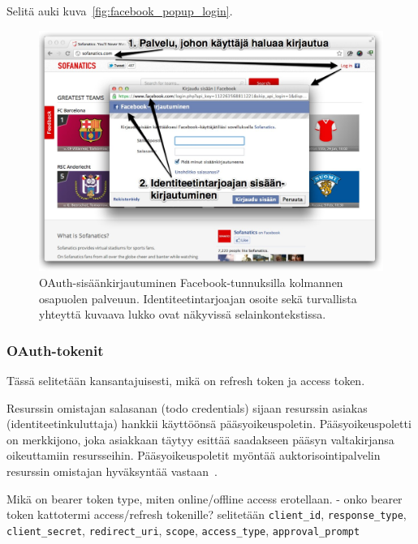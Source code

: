 \documentclass[finnish,gradu]{tktltiki}
\begin{document}
  Selitä auki kuva~\ref{fig:facebook_popup_login}.

  \begin{figure}
    \centering
    \includegraphics[width=1.0\textwidth]{images/facebook_popup_login.jpg}
    \caption{OAuth-sisäänkirjautuminen Facebook-tunnuksilla kolmannen osapuolen palveuun. Identiteetintarjoajan osoite sekä turvallista yhteyttä kuvaava lukko ovat näkyvissä selainkontekstissa.}
    \label{fig:facebook_oauth_login}
  \end{figure}

  \subsubsection{OAuth-tokenit} %
  \label{ssub:oauth_tokenit}

  Tässä selitetään kansantajuisesti, mikä on refresh token ja access token.

  Resurssin omistajan salasanan (todo credentials) sijaan resurssin asiakas (identiteetinkuluttaja) hankkii käyttöönsä pääsyoikeuspoletin. Pääsyoikeuspoletti on merkkijono, joka asiakkaan täytyy esittää saadakseen pääsyn valtakirjansa oikeuttamiin resursseihin. Pääsyoikeuspoletit myöntää auktorisointipalvelin resurssin omistajan hyväksyntää vastaan~\cite{ietf_oauth2}.

  Mikä on bearer token type, miten online/offline access erotellaan.
  - onko bearer token kattotermi access/refresh tokenille?
  selitetään \verb!client_id!, \verb!response_type!, \verb!client_secret!, \verb!redirect_uri!, \verb!scope!, \verb!access_type!, \verb!approval_prompt!
\end{document}
